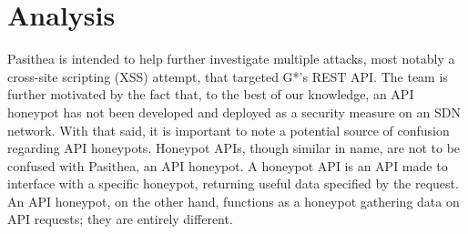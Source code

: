 \documentclass[10pt, conference]{IEEEtran}
\begin{document}
%





\section{Analysis}
\label{Analysis}
Pasithea is intended to help further investigate multiple attacks, most notably a cross-site scripting (XSS) attempt, that targeted G*’s REST API. The team is further motivated by the fact that, to the best of our knowledge, an API honeypot has not been developed and deployed as a security measure on an SDN network. With that said, it is important to note a potential source of confusion regarding API honeypots. Honeypot APIs, though similar in name, are not to be confused with Pasithea, an API honeypot. A honeypot API is an API made to interface with a specific honeypot, returning useful data specified by the request. An API honeypot, on the other hand, functions as a honeypot gathering data on API requests; they are entirely different.
\end{document}
